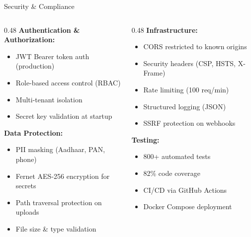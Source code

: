 \documentclass[aspectratio=169,11pt]{beamer}
\begin{document}
\begin{frame}{Security \& Compliance}
\begin{columns}
\begin{column}{0.48\textwidth}
\textbf{Authentication \& Authorization:}
\begin{itemize}
    \item JWT Bearer token auth (production)
    \item Role-based access control (RBAC)
    \item Multi-tenant isolation
    \item Secret key validation at startup
\end{itemize}
\vspace{0.5em}
\textbf{Data Protection:}
\begin{itemize}
    \item PII masking (Aadhaar, PAN, phone)
    \item Fernet AES-256 encryption for secrets
    \item Path traversal protection on uploads
    \item File size \& type validation
\end{itemize}
\end{column}
\begin{column}{0.48\textwidth}
\textbf{Infrastructure:}
\begin{itemize}
    \item CORS restricted to known origins
    \item Security headers (CSP, HSTS, X-Frame)
    \item Rate limiting (100 req/min)
    \item Structured logging (JSON)
    \item SSRF protection on webhooks
\end{itemize}
\vspace{0.5em}
\textbf{Testing:}
\begin{itemize}
    \item 800+ automated tests
    \item 82\% code coverage
    \item CI/CD via GitHub Actions
    \item Docker Compose deployment
\end{itemize}
\end{column}
\end{columns}
\end{frame}
\end{document}
